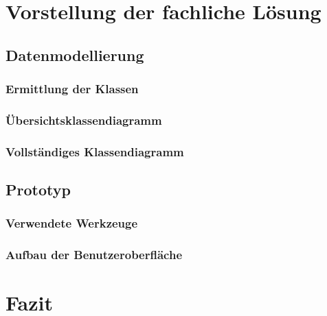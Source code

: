 \documentclass[12pt, titlepage]{article}
\begin{document}


\doublespacing














\section{Vorstellung der fachliche Lösung}
\subsection{Datenmodellierung}
\subsubsection{Ermittlung der Klassen}
\subsubsection{Übersichtsklassendiagramm}
\subsubsection{Vollständiges Klassendiagramm}

\subsection{Prototyp}
\subsubsection{Verwendete Werkzeuge}
\subsubsection{Aufbau der Benutzeroberfläche}

\newpage
\section{Fazit}
\end{document}
